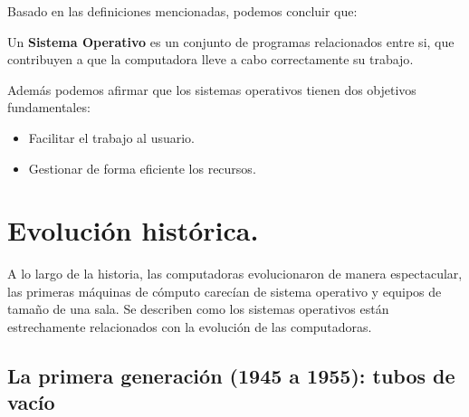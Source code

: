	Basado en las definiciones mencionadas, podemos concluir que:
	
	
	\begin{tcolorbox}
		Un \textbf{Sistema Operativo }es un conjunto de programas relacionados entre si, que contribuyen a que la computadora lleve a cabo correctamente su trabajo\cite{introsistema}.
	\end{tcolorbox}
	
	Además podemos afirmar que los sistemas operativos tienen dos objetivos fundamentales:
\begin{itemize}
	\item Facilitar el trabajo al usuario.
	\item Gestionar de forma eficiente los recursos.
\end{itemize}

\section{Evolución histórica.}
A lo largo de la historia, las computadoras evolucionaron de manera espectacular, las primeras máquinas de cómputo carecían de sistema operativo y equipos de tamaño de una sala. Se describen como los sistemas operativos están estrechamente relacionados con la evolución de las computadoras.



\subsection{La primera generación (1945 a 1955): tubos de vacío}

